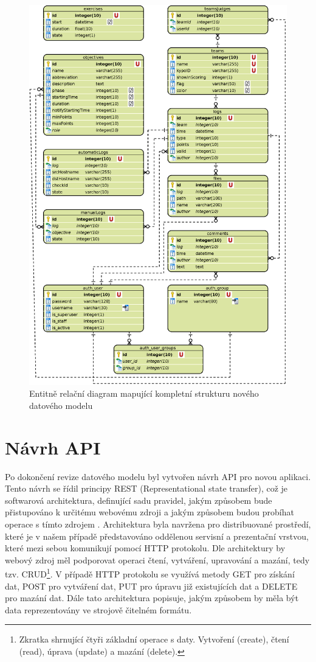 \documentclass[
  digital, %
  twoside, %
  table,   %
  lof,     %
  lot,     %
]{fithesis3}
\begin{document}
\begin{figure}
    \centering
    \includegraphics[width=12.5cm]{images/ERD-new-app.eps}
    \caption{Entitně relační diagram mapující kompletní strukturu nového datového modelu}
    \label{fig:erdNewApp}
\end{figure}

\section{Návrh API}

Po dokončení revize datového modelu byl vytvořen návrh API pro novou aplikaci. Tento návrh se řídil principy REST (Representational state transfer), což je softwarová architektura, definující sadu pravidel, jakým způsobem bude přistupováno k určitému webovému zdroji a jakým způsobem budou probíhat operace s tímto zdrojem \cite{RoyThomasFielding2000ArchitecturalArchitectures}. Architektura byla navržena pro distribuované prostředí, které je v našem případě představováno oddělenou servisní a prezentační vrstvou, které mezi sebou komunikují pomocí HTTP protokolu. Dle architektury by webový zdroj měl podporovat operaci čtení, vytváření, upravování a mazání, tedy tzv. CRUD\footnote{Zkratka shrnující čtyři základní operace s daty. Vytvoření (create), čtení (read), úprava (update) a mazání (delete).}. V případě HTTP protokolu se využívá metody GET pro získání dat, POST pro vytváření dat, PUT pro úpravu již existujících dat a DELETE pro mazání dat. Dále tato architektura popisuje, jakým způsobem by měla být data reprezentovány ve strojově čitelném formátu. \cite{RoyThomasFielding2000ArchitecturalArchitectures}
\end{document}

